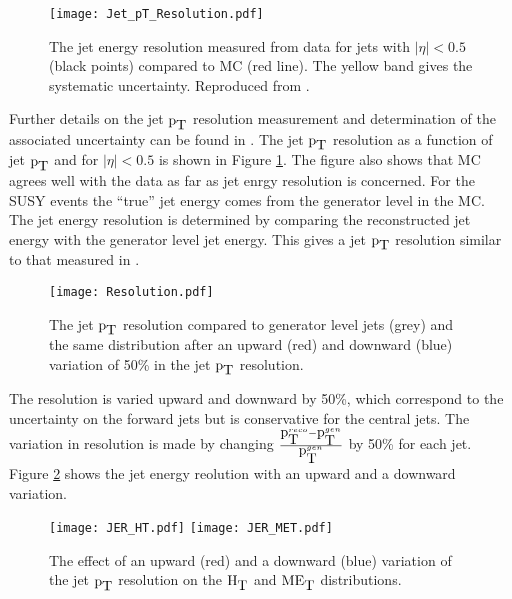 \begin{figure}
\begin{center}
\texttt{[image: Jet\_pT\_Resolution.pdf]}
\end{center}
\caption{The jet energy resolution measured from data for jets with $|\eta| <
0.5$ (black points) compared to MC (red line). The yellow band gives the
systematic uncertainty. Reproduced from \cite{jec}.}
\label{fig:Jet_pT_Resolution}
\end{figure}

Further details on the jet $\mbox{p}_{\mbox{T}}$ resolution measurement and determination of the
associated uncertainty can be found in \cite{jec}. The jet $\mbox{p}_{\mbox{T}}$ resolution as a
function of jet $\mbox{p}_{\mbox{T}}$ and for $|\eta| < 0.5$ is shown in Figure
\ref{fig:Jet_pT_Resolution}. The figure also shows that MC agrees well with the
data as far as jet enrgy resolution is concerned. For the SUSY events the 
``true'' jet energy comes from the generator level in the MC. The jet energy 
resolution is determined by comparing the reconstructed jet energy with the 
generator level jet energy. This gives a jet $\mbox{p}_{\mbox{T}}$ resolution similar to that 
measured in \cite{jec}. \\

\begin{figure}
\begin{center}
\texttt{[image: Resolution.pdf]}
\end{center}
\caption{The jet $\mbox{p}_{\mbox{T}}$ resolution compared to generator level jets (grey) and
the same distribution after an upward (red) and downward (blue) 
variation of 50\% in the jet $\mbox{p}_{\mbox{T}}$ resolution.}
\label{fig:Resolution}
\end{figure}

The resolution is varied upward and downward by 50\%, which correspond to the 
uncertainty on the forward jets but is conservative for the central jets. The
variation in resolution is made by changing $\frac{\mbox{p}_{\mbox{T}}^{reco} -
\mbox{p}_{\mbox{T}}^{gen}}{\mbox{p}_{\mbox{T}}^{gen}}$ by 50\% for each jet. Figure \ref{fig:Resolution}
shows the jet energy reolution with an upward and a downward variation. \\

\begin{figure}
\texttt{[image: JER\_HT.pdf]}
\texttt{[image: JER\_MET.pdf]}
\caption{The effect of an upward (red) and a downward (blue) variation
of the jet $\mbox{p}_{\mbox{T}}$ resolution on the $\mbox{H}_{\mbox{T}}$ and $\mbox{ME}_{\mbox{T}}$ distributions.}
\label{fig:JER}
\end{figure}

